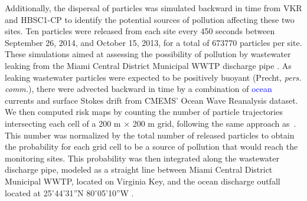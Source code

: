\documentclass[preprint,12pt,authoryear]{elsarticle}
\newcommand{\modif}[1]{\textcolor{blue}{#1}}
\begin{document}
Additionally, the dispersal of particles was simulated backward in time from VKR and HBSC1-CP to identify the potential sources of pollution affecting these two sites. Ten particles were released from each site every 450 seconds between September 26, 2014, and October 15, 2013, for a total of 673770 particles per site. These simulations aimed at assessing the possibility of pollution by wastewater leaking from the Miami Central District Municipal WWTP discharge pipe \citep{gintert2019regional}. As leaking wastewater particles were expected to be positively buoyant (Precht, \textit{pers. comm.}), there were advected backward in time by a combination of \modif{ocean} currents and surface Stokes drift from CMEMS' Ocean Wave Reanalysis dataset. We then computed risk maps by counting the number of particle trajectories intersecting each cell of a 200 m $\times$ 200 m grid, following the same approach as~\cite{anselain2023qatar}. This number was normalized by the total number of released particles to obtain the probability for each grid cell to be a source of pollution that would reach the monitoring sites.
This probability was then integrated along the wastewater discharge pipe, modeled as a straight line between Miami Central District Municipal WWTP, located on Virginia Key, and the ocean discharge outfall located at 25$^\circ$44'31''N 80$^\circ$05'10''W \citep{koopman2006ocean}.
\end{document}
